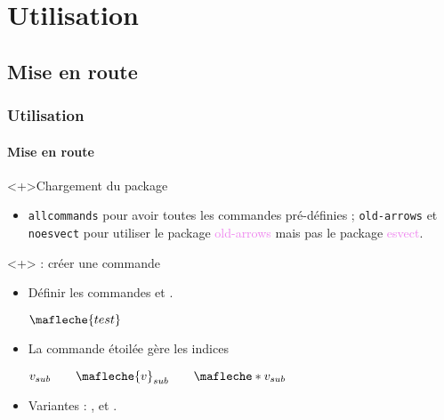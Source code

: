 \documentclass[10pt, aspectratio=3218]{beamer}
\newcommand*{\pkg}[1]{\textcolor{violet}{\textsf{#1}}}
\newcommand*{\opt}[1]{\textcolor{Definition}{\texttt{\small #1}}}
\newcommand*{\symb}[1]{\colorbox{yellow!50}{\rule{0pt}{1ex}$#1$}}
\begin{document}
\begin{frame}[fragile]
\begin{itemize}

\end{itemize}
\end{frame}

\section{Utilisation}

\subsection{Mise en route}

\begin{frame}[fragile]

\frametitle{Utilisation}
\framesubtitle{Mise en route}

\begin{block}<+>{Chargement du package}
  \begin{dispListing}
\usepackage[allcommands, old-arrows, noesvect]{overarrows}
  \end{dispListing}
  \begin{itemize}
   \item \opt{allcommands} pour avoir toutes les commandes pré-définies ;
     \opt{old-arrows} et \opt{noesvect} pour utiliser le package
     \pkg{old-arrows} mais pas le package \pkg{esvect}.
  \end{itemize}
\end{block}

\begin{block}<+>{ : créer une commande}
  \begin{itemize}
   \item Définir les commandes  et .
\undef\mafleche%
    \begin{dispExample}
$ \mafleche{test} $
    \end{dispExample}
   \item La commande étoilée  gère les indices
    \begin{dispExample}
$ v_{sub} \qquad \mafleche{v}_{sub} \qquad \mafleche*{v}_{sub} $
    \end{dispExample}
   \item Variantes : ,  et .
  \end{itemize}
\end{block}

\end{frame}
\end{document}
